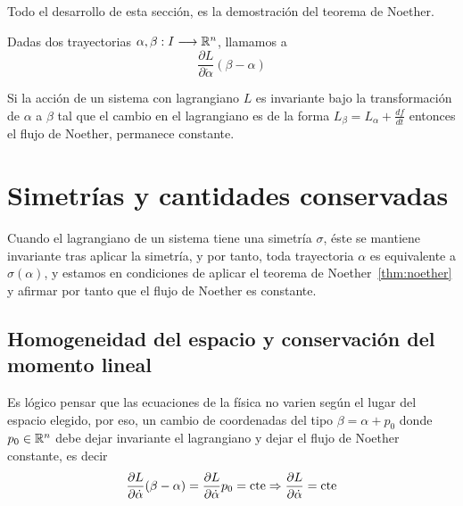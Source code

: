Todo el desarrollo de esta sección, es la demostración del teorema de Noether.

\begin{definition}
    Dadas dos trayectorias $\alpha,\beta:I\longrightarrow \mathbb{R}^n$, llamamos  a
    \begin{equation}
        \label{eq:flujo_noether}
        \frac{\partial L}{\partial\dot{\alpha}}(\beta-\alpha)
    \end{equation}
\end{definition}

\begin{theorem}
    \label{thm:noether}
    Si la acción de un sistema con lagrangiano $L$ es invariante bajo la transformación de $\alpha$ a $\beta$ tal que el cambio en el lagrangiano es de la forma $L_\beta=L_\alpha+\frac{df}{dt}$ entonces el flujo de Noether, permanece constante.
\end{theorem}


\chapter{Simetrías y cantidades conservadas}
Cuando el lagrangiano de un sistema tiene una simetría $\sigma$, éste se mantiene invariante tras aplicar la simetría, y por tanto, toda trayectoria $\alpha$ es equivalente a $\sigma(\alpha)$, y estamos en condiciones de aplicar el teorema de Noether~\ref{thm:noether} y afirmar por tanto que el flujo de Noether es constante.


\section{Homogeneidad del espacio y conservación del momento lineal}
Es lógico pensar que las ecuaciones de la física no varien según el lugar del espacio elegido, por eso, un cambio de coordenadas del tipo $\beta=\alpha+p_0$ donde $p_0\in\mathbb{R}^n$ debe dejar invariante el lagrangiano y dejar el flujo de Noether constante, es decir
\begin{equation}
    \label{eq:conservacion_momento_lineal}
    \frac{\partial L}{\partial\dot{\alpha}}(\beta-\alpha) = \frac{\partial L}{\partial\dot{\alpha}}p_0=\text{cte}\Rightarrow\frac{\partial L}{\partial\dot{\alpha}}=\text{cte}
\end{equation}


